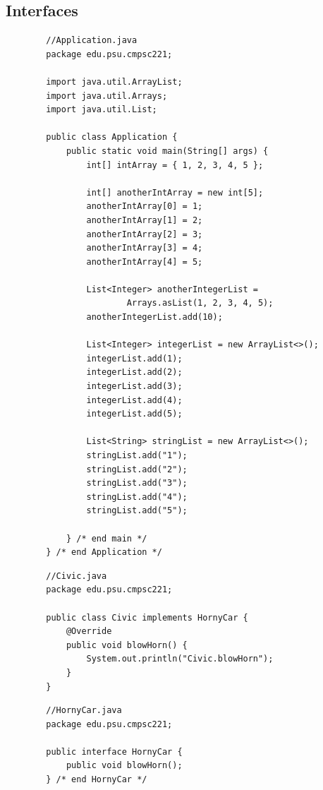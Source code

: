\documentclass[a4paper, 11pt]{article}
\begin{document}
    \newpage

    \subsection{Interfaces}

        \begin{lstlisting}
        //Application.java
        package edu.psu.cmpsc221;

        import java.util.ArrayList;
        import java.util.Arrays;
        import java.util.List;

        public class Application {
            public static void main(String[] args) {
                int[] intArray = { 1, 2, 3, 4, 5 };

                int[] anotherIntArray = new int[5];
                anotherIntArray[0] = 1;
                anotherIntArray[1] = 2;
                anotherIntArray[2] = 3;
                anotherIntArray[3] = 4;
                anotherIntArray[4] = 5;

                List<Integer> anotherIntegerList =
                        Arrays.asList(1, 2, 3, 4, 5);
                anotherIntegerList.add(10);

                List<Integer> integerList = new ArrayList<>();
                integerList.add(1);
                integerList.add(2);
                integerList.add(3);
                integerList.add(4);
                integerList.add(5);

                List<String> stringList = new ArrayList<>();
                stringList.add("1");
                stringList.add("2");
                stringList.add("3");
                stringList.add("4");
                stringList.add("5");

            } /* end main */
        } /* end Application */
        \end{lstlisting}

        \begin{lstlisting}
        //Civic.java
        package edu.psu.cmpsc221;

        public class Civic implements HornyCar {
            @Override
            public void blowHorn() {
                System.out.println("Civic.blowHorn");
            }
        }
        \end{lstlisting}

        \begin{lstlisting}
        //HornyCar.java
        package edu.psu.cmpsc221;

        public interface HornyCar {
            public void blowHorn();
        } /* end HornyCar */
        \end{lstlisting}
\end{document}
